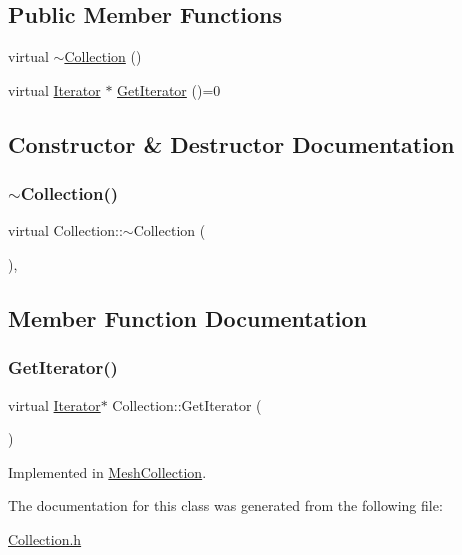 \subsection*{Public Member Functions}
\begin{DoxyCompactItemize}
\item 
virtual \mbox{\hyperlink{class_collection_ab3938d189a8186230a7999cfa465d37f}{$\sim$\+Collection}} ()
\item 
virtual \mbox{\hyperlink{class_iterator}{Iterator}} $\ast$ \mbox{\hyperlink{class_collection_a3f973deaf28b8c098f3bcbe9737b9780}{Get\+Iterator}} ()=0
\end{DoxyCompactItemize}


\subsection{Constructor \& Destructor Documentation}
\mbox{\label{class_collection_ab3938d189a8186230a7999cfa465d37f}} 
\subsubsection{\texorpdfstring{$\sim$Collection()}{~Collection()}}
{\footnotesize\ttfamily virtual Collection\+::$\sim$\+Collection (\begin{DoxyParamCaption}{ }\end{DoxyParamCaption})\hspace{0.3cm}{\ttfamily [inline]}, {\ttfamily [virtual]}}



\subsection{Member Function Documentation}
\mbox{\label{class_collection_a3f973deaf28b8c098f3bcbe9737b9780}} 
\subsubsection{\texorpdfstring{GetIterator()}{GetIterator()}}
{\footnotesize\ttfamily virtual \mbox{\hyperlink{class_iterator}{Iterator}}$\ast$ Collection\+::\+Get\+Iterator (\begin{DoxyParamCaption}{ }\end{DoxyParamCaption})\hspace{0.3cm}{\ttfamily [pure virtual]}}



Implemented in \mbox{\hyperlink{class_mesh_collection_ac0a6c3c91ed15c06292d5e659f8259ae}{Mesh\+Collection}}.



The documentation for this class was generated from the following file\+:\begin{DoxyCompactItemize}
\item 
\mbox{\hyperlink{_collection_8h}{Collection.\+h}}\end{DoxyCompactItemize}
